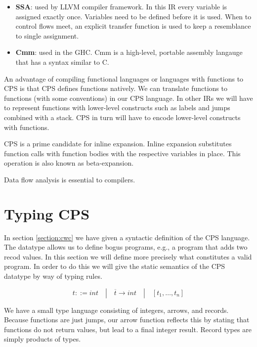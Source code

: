 \begin{itemize}
\item \textbf{SSA}\autocite{DBLP:journals/toplas/CytronFRWZ91}: used by LLVM\autocite{llvmlangref} compiler framework. In this \ac{IR} every variable is assigned exactly once. Variables need to be defined before it is used. When to control flows meet, an explicit transfer function is used to keep a resemblance to single assignment.
\item \textbf{Cmm}\autocite{DBLP:conf/ppdp/JonesRR99, haskellcmm}: used in the \ac{GHC}. Cmm is a high-level, portable assembly langauge that has a syntax similar to C.
\end{itemize}

An advantage of compiling functional languages or languages with functions to \ac{CPS} is that \ac{CPS} defines functions natively. We can translate functions to functions (with some conventions) in our \ac{CPS} language. In other \acp{IR} we will have to represent functions with lower-level constructs such as labels and jumps combined with a stack. \ac{CPS} in turn will have to encode lower-level constructs with functions.

\ac{CPS} is a prime candidate for inline expansion. Inline expansion substitutes function calls with function bodies with the respective variables in place. This operation is also known as beta-expansion.

Data flow analysis is essential to compilers. 

\section{\label{section:cpstype}Typing CPS}
In section \ref{section:cwc} we have given a syntactic definition of the \ac{CPS} language. The datatype allows us to define bogus programs, e.g., a program that adds two recod values. In this section we will define more precisely what constitutes a valid program. In order to do this we will give the static semantics of the \ac{CPS} datatype by way of typing rules\autocite{DBLP:conf/popl/MorrisettWCG98, DBLP:conf/pldi/Chlipala07}.

\begin{equation*}
t ::= int \quad | \quad \overline{t} \to int \quad | \quad [t_1, \dots, t_n]
\end{equation*}

We have a small type language consisting of integers, arrows, and records. Because functions are just jumps, our arrow function reflects this by stating that functions do not return values, but lead to a final integer result. Record types are simply products of types.

